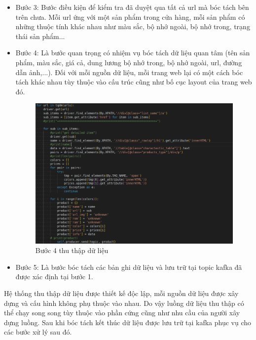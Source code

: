 \documentclass[../DoAn.tex]{subfiles}
\begin{document}
\begin{itemize}
    \item Bước 3: Bước điều kiện để kiểm tra đã duyệt qua tất cả url mà bóc tách bên trên chưa. Mỗi url ứng với một sản phẩm trong cửa hàng, mỗi sản phẩm có những thuộc tính khác nhau như màu sắc, bộ nhớ ngoài, bộ nhớ trong, trạng thái sản phẩm...

    \item Bước 4: Là bước quan trọng có nhiệm vụ bóc tách dữ liệu quan tâm (tên sản phẩm, màu sắc, giá cả, dung lương bộ nhớ trong, bộ nhớ ngoài, url, đường dẫn ảnh,...). Đối với mỗi nguồn dữ liệu, mỗi trang web lại có một cách bóc tách khác nhau tùy thuộc vào cấu trúc cũng như bố cục layout của trang web đó.

    \begin{figure}[H]
        \centering
        \includegraphics[scale=0.35]{Hinhve/step4_crawl_system.png}
        \caption{Bước 4 thu thập dữ liệu}
        \label{fig:my_label2}
    \end{figure}
    
    \item Bước 5: Là bước bóc tách các bản ghi dữ liệu và lưu trữ tại topic kafka đã được xác định tại bước 1.
\end{itemize}

Hệ thống thu thập dữ liệu được thiết kế độc lập, mỗi nguồn dữ liệu được xây dựng và cấu hình không phụ thuộc vào nhau. Do vậy luồng dữ liệu thu thập có thể chạy song song tùy thuộc vào phần cứng cũng như nhu cầu của người xây dựng luồng. Sau khi bóc tách kết thúc dữ liệu được lưu trữ tại kafka phục vụ cho các bước xử lý sau đó. 
\end{document}
